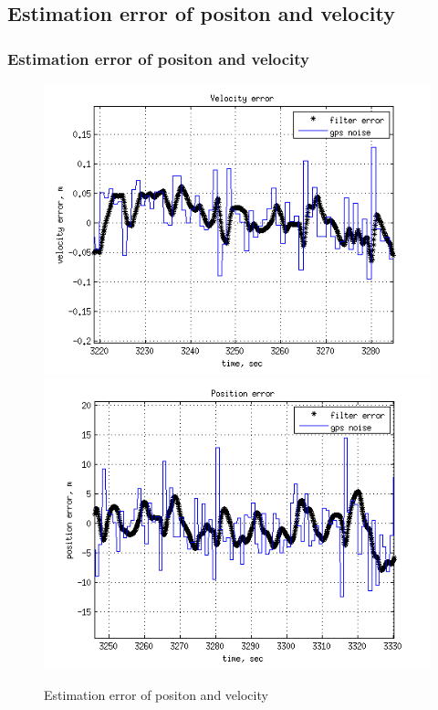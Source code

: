 \documentclass[compress]{beamer}    %
\begin{document}
\subsection{Estimation error of positon and velocity}
\begin{frame}
\frametitle{Estimation error of positon and velocity}
\noindent

\begin{figure}[l]
  \centering
  \includegraphics[scale=0.41]{vn_err_of_err}
  \includegraphics[scale=0.41]{phi_err_of_err}
  \caption{Estimation error of positon and velocity}
  \label{fig:comp_pos}
\end{figure}
\end{frame}
\end{document}
